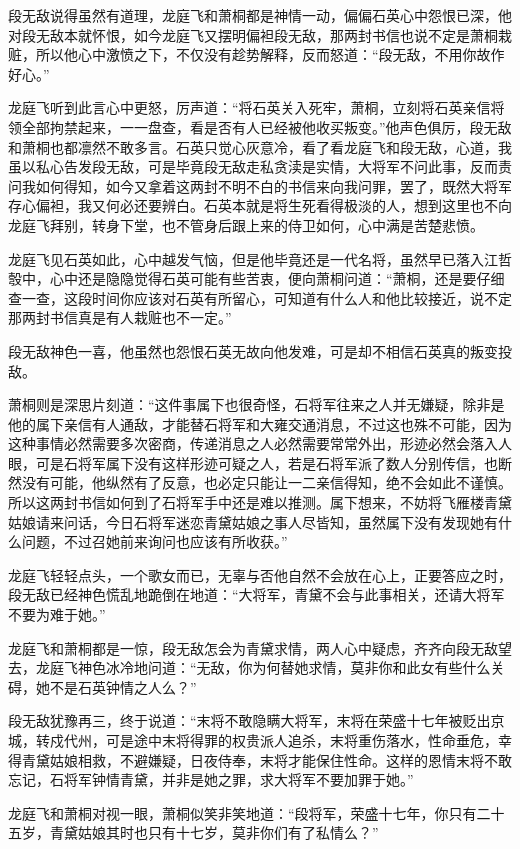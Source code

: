 段无敌说得虽然有道理，龙庭飞和萧桐都是神情一动，偏偏石英心中怨恨已深，他对段无敌本就怀恨，如今龙庭飞又摆明偏袒段无敌，那两封书信也说不定是萧桐栽赃，所以他心中激愤之下，不仅没有趁势解释，反而怒道：“段无敌，不用你故作好心。”

龙庭飞听到此言心中更怒，厉声道：“将石英关入死牢，萧桐，立刻将石英亲信将领全部拘禁起来，一一盘查，看是否有人已经被他收买叛变。”他声色俱厉，段无敌和萧桐也都凛然不敢多言。石英只觉心灰意冷，看了看龙庭飞和段无敌，心道，我虽以私心告发段无敌，可是毕竟段无敌走私贪渎是实情，大将军不问此事，反而责问我如何得知，如今又拿着这两封不明不白的书信来向我问罪，罢了，既然大将军存心偏袒，我又何必还要辨白。石英本就是将生死看得极淡的人，想到这里也不向龙庭飞拜别，转身下堂，也不管身后跟上来的侍卫如何，心中满是苦楚悲愤。

龙庭飞见石英如此，心中越发气恼，但是他毕竟还是一代名将，虽然早已落入江哲彀中，心中还是隐隐觉得石英可能有些苦衷，便向萧桐问道：“萧桐，还是要仔细查一查，这段时间你应该对石英有所留心，可知道有什么人和他比较接近，说不定那两封书信真是有人栽赃也不一定。”

段无敌神色一喜，他虽然也怨恨石英无故向他发难，可是却不相信石英真的叛变投敌。

萧桐则是深思片刻道：“这件事属下也很奇怪，石将军往来之人并无嫌疑，除非是他的属下亲信有人通敌，才能替石将军和大雍交通消息，不过这也殊不可能，因为这种事情必然需要多次密商，传递消息之人必然需要常常外出，形迹必然会落入人眼，可是石将军属下没有这样形迹可疑之人，若是石将军派了数人分别传信，也断然没有可能，他纵然有了反意，也必定只能让一二亲信得知，绝不会如此不谨慎。所以这两封书信如何到了石将军手中还是难以推测。属下想来，不妨将飞雁楼青黛姑娘请来问话，今日石将军迷恋青黛姑娘之事人尽皆知，虽然属下没有发现她有什么问题，不过召她前来询问也应该有所收获。”

龙庭飞轻轻点头，一个歌女而已，无辜与否他自然不会放在心上，正要答应之时，段无敌已经神色慌乱地跪倒在地道：“大将军，青黛不会与此事相关，还请大将军不要为难于她。”

龙庭飞和萧桐都是一惊，段无敌怎会为青黛求情，两人心中疑虑，齐齐向段无敌望去，龙庭飞神色冰冷地问道：“无敌，你为何替她求情，莫非你和此女有些什么关碍，她不是石英钟情之人么？”

段无敌犹豫再三，终于说道：“末将不敢隐瞒大将军，末将在荣盛十七年被贬出京城，转戍代州，可是途中末将得罪的权贵派人追杀，末将重伤落水，性命垂危，幸得青黛姑娘相救，不避嫌疑，日夜侍奉，末将才能保住性命。这样的恩情末将不敢忘记，石将军钟情青黛，并非是她之罪，求大将军不要加罪于她。”

龙庭飞和萧桐对视一眼，萧桐似笑非笑地道：“段将军，荣盛十七年，你只有二十五岁，青黛姑娘其时也只有十七岁，莫非你们有了私情么？”

